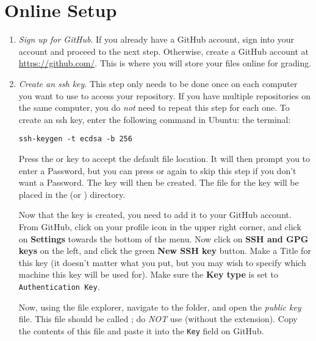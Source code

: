 \section*{Online Setup}
\begin{enumerate}
    \item \emph{Sign up for GitHub}.
    \label{step:sign-up}
    If you already have a GitHub account, sign into your account and proceed to the next step.
    Otherwise, create a GitHub account at \url{https://github.com/}.
    This is where you will store your files online for grading.
  

    \item \emph{Create an ssh key}.
    This step only needs to be done once on each computer you want to use to access your repository.
    If you have multiple repositories on the same computer, you do \emph{not} need to repeat this step for each one.
    To create an ssh key, enter the following command in
    \ifwindows
    Ubuntu:
    \else
    the terminal:
    \fi
\begin{lstlisting}
ssh-keygen -t ecdsa -b 256
\end{lstlisting}
    Press the  or  key to accept the default file location.
    It will then prompt you to enter a Password, but you can press  or  again to skip this step if you don't want a Password.
    The key will then be created.
    The file for the key will be placed in the  (or ) directory.
  
    Now that the key is created, you need to add it to your GitHub account.
    From GitHub, click on your profile icon in the upper right corner, and click on \textbf{Settings} towards the bottom of the menu.
    Now click on \textbf{SSH and GPG keys} on the left, and click the green \textbf{New SSH key} button.
    Make a Title for this key (it doesn't matter what you put, but you may wish to specify which machine this key will be used for).
    Make sure the \textbf{Key type} is set to \texttt{Authentication Key}.

    Now, using the file explorer, navigate to the  folder, and open the \emph{public key} file.
    This file should be called ; do \emph{NOT} use  (without the  extension).
    Copy the contents of this file and paste it into the \texttt{Key} field on GitHub. 


\end{enumerate}
